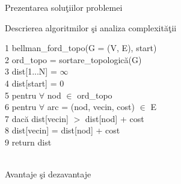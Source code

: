 \documentclass[a4paper]{article}
\begin{document}
\begin{section}{Prezentarea solu\c tiilor problemei\\}
\begin{subsection}{Descrierea algoritmilor \c si analiza complexit\u a\c tii\\}
\begin{enumerate}
	1 \quad bellman\_ford\_topo(G = (V, E), start) \\
	2 \quad\quad\quad ord\_topo = sortare\_topologic\u a(G) \\
	3 \quad\quad\quad dist[1...N] = $\infty$ \\
	4 \quad\quad\quad dist[start] = 0 \\ 

	5 \quad\quad\quad pentru $\forall$ nod $\in$ ord\_topo \\
	6  \quad\quad\quad\quad\quad pentru $\forall$ arc = (nod, vecin, cost) $\in$ E \\
	7 \quad\quad\quad\quad\quad\quad\quad dac\u a dist[vecin] $>$ dist[nod] + cost \\
	8 \quad\quad\quad\quad\quad\quad\quad\quad\quad  dist[vecin] = dist[nod] + cost \\

	9 \quad\quad\quad return dist \\ \\

\end{enumerate}

\end{subsection}


\begin{subsection}{Avantaje \c si dezavantaje\\}


\end{subsection}
\end{section}
\end{document}
